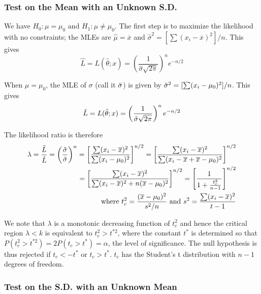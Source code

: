 \documentclass{article}
\begin{document}
\subsubsection{Test on the Mean with an Unknown S.D.}

We have \(H_0:\mu=\mu_0 \text{ and } H_1: \mu \neq \mu_0\). The first step is to maximize the likelihood with no constraints; the MLEs are \(\hat{\mu}=\overline{x}\) and \(\hat{\sigma}^2=[\sum (x_i-\overline{x})^2]/n\). This gives
\begin{equation*}
    \hat{L}=L(\hat{\theta};x)=\left(\frac{1}{\hat{\sigma}\sqrt{2\pi}}\right)^n e^{-n/2}
\end{equation*}

When \(\mu=\mu_0\), the MLE of \(\sigma\) (call it \(\Tilde{\sigma}\)) is given by \(\Tilde{\sigma}^2=[\sum (x_i-\mu_0)^2]/n\). This gives
\begin{equation*}
    \Tilde{L}=L(\Tilde{\theta};x)=\left(\frac{1}{\Tilde{\sigma}\sqrt{2\pi}}\right)^n e^{-n/2}
\end{equation*}

The likelihood ratio is therefore
\begin{equation*}
    \begin{split}
        \lambda=\frac{\Tilde{L}}{\hat{L}}=\left( \frac{\hat{\sigma}}{\Tilde{\sigma}}\right)^n = \left[\frac{\sum(x_i-\overline{x})^2}{\sum(x_i-\mu_0)^2} \right]^{n/2} = \left[\frac{\sum(x_i-\overline{x})^2}{\sum(x_i-\overline{x}+\overline{x}-\mu_0)^2} \right]^{n/2}\\
        = \left[\frac{\sum(x_i-\overline{x})^2}{\sum(x_i-\overline{x})^2+n(\overline{x}-\mu_0)^2} \right]^{n/2}=\left[\frac{1}{1+\frac{t_c^2}{n-1}} \right]^{n/2} \\
        \text{ where } t_c^2=\frac{(\overline{x}-\mu_0)^2}{s^2/n} \text{ and } s^2=\frac{\sum(x_i-\overline{x})^2}{t-1}
    \end{split}
\end{equation*}

We note that \(\lambda\) is a monotonic decreasing function of \(t_c^2\) and hence the critical region \(\lambda<k\) is equivalent to \(t_c^2>t^{*2}\), where the constant \(t^{*}\) is determined so that \(P(t_c^2>t^{*2})=2P(t_c>t^*)=\alpha\), the level of significance. The null hypothesis is thus rejected if \(t_c<-t^* \text{ or } t_c>t^*\). \(t_c\) has the Student's t distribution with \(n-1\) degrees of freedom.

\subsubsection{Test on the S.D. with an Unknown Mean}
\end{document}
